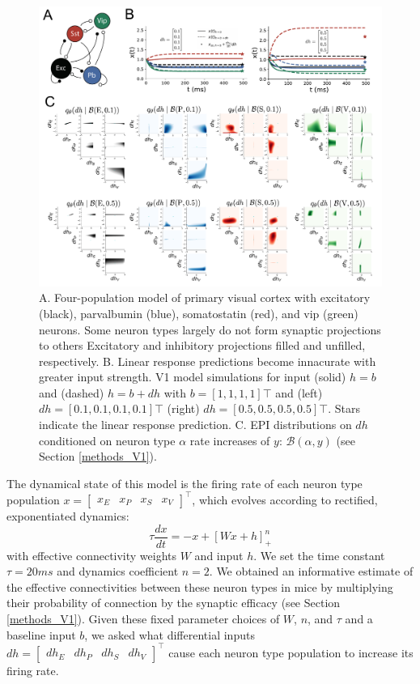 \documentclass[11pt]{article}
\begin{document}
\begin{figure}
\begin{center}
\includegraphics[scale=0.5]{figs/fig3/fig3.pdf}
\end{center}
\caption{A. Four-population model of primary visual cortex with excitatory (black), parvalbumin (blue), somatostatin (red), and vip (green) neurons.   Some neuron types largely do not form synaptic projections to others Excitatory and inhibitory projections filled and unfilled, respectively.  B. Linear response predictions become innacurate with greater input strength.  V1 model simulations for input (solid) $h=b$ and (dashed) $h = b + dh$ with $b = \left[1, 1, 1, 1\right]\top$ and (left) $dh = \left[0.1, 0.1, 0.1, 0.1\right]\top$ (right) $dh = \left[0.5, 0.5, 0.5, 0.5\right]\top$.  Stars indicate the linear response prediction.  C. EPI distributions on $dh$ conditioned on neuron type $\alpha$ rate increases of $y$: $\mathcal{B}(\alpha, y)$ (see Section \ref{methods_V1}).}
\end{figure}

The dynamical state of this model is the firing rate of each neuron type population $x = \begin{bmatrix} x_E & x_P & x_S & x_V \end{bmatrix}^\top$, which evolves according to rectified, exponentiated dynamics:
\begin{equation}
\tau \frac{dx}{dt} = -x + [W x+ h]_+^n
\end{equation}
with effective connectivity weights $W$ and input $h$.  We set the time constant $\tau = 20ms$ and dynamics coefficient $n = 2$.  
We obtained an informative estimate of the effective connectivities between these neuron types in mice by multiplying their probability of connection by the synaptic efficacy \cite{allen} (see Section \ref{methods_V1}).
Given these fixed parameter choices of $W$, $n$, and $\tau$ and a baseline input $b$, we asked what differential inputs $dh = \begin{bmatrix} dh_E & dh_P & dh_S & dh_V \end{bmatrix}^\top$ cause each neuron type population to increase its firing rate.
\end{document}
